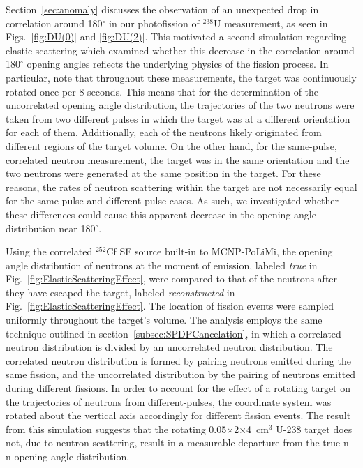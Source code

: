 Section~\ref{sec:anomaly} discusses the observation of an unexpected drop in correlation around 180$^{\circ}$ in our photofission of $^{238}$U measurement, as seen in Figs.~\ref{fig:DU(0)} and \ref{fig:DU(2)}.
This motivated a second simulation regarding elastic scattering which examined whether this decrease in the correlation around 180$^{\circ}$ opening angles reflects the underlying physics of the fission process.
In particular, note that throughout these measurements, the target was continuously rotated once per 8 seconds.
This means that for the determination of the uncorrelated opening angle distribution, the trajectories of the two neutrons were taken from two different pulses in which the target was at a different orientation for each of them.
Additionally, each of the neutrons likely originated from different regions of the target volume.
On the other hand, for the same-pulse, correlated neutron measurement, the target was in the same orientation and the two neutrons were generated at the same position in the target.
For these reasons, the rates of neutron scattering within the target are not necessarily equal for the same-pulse and different-pulse cases.
As such, we investigated whether these differences could cause this apparent decrease in the opening angle distribution near 180$^{\circ}$.

Using the correlated $^{252}$Cf SF source built-in to MCNP-PoLiMi, the opening angle distribution of neutrons at the moment of emission, labeled \emph{true} in Fig.~\ref{fig:ElasticScatteringEffect}, were compared to that of the neutrons after they have escaped the target, labeled \emph{reconstructed} in Fig.~\ref{fig:ElasticScatteringEffect}.
The location of fission events were sampled uniformly throughout the target's volume.
The analysis employs the same technique outlined in section~\ref{subsec:SPDPCancelation}, in which a correlated neutron distribution is divided by an uncorrelated neutron distribution.
The correlated neutron distribution is formed by pairing neutrons emitted during the same fission, and the uncorrelated distribution by the pairing of neutrons emitted during different fissions.
In order to account for the effect of a rotating target on the trajectories of neutrons from different-pulses, the coordinate system was rotated about the vertical axis accordingly for different fission events.
The result from this simulation suggests that the rotating 0.05$\times$2$\times$4~cm$^3$ U-238 target does not, due to neutron scattering, result in a measurable departure from the true n-n opening angle distribution.

